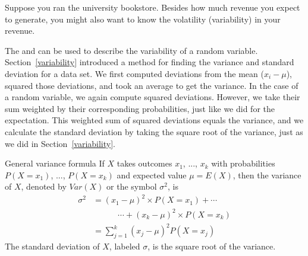 Suppose you ran the university bookstore. Besides how much revenue you expect to generate, you might also want to know the volatility (variability) in your revenue. 

The  and  can be used to describe the variability of a random variable. Section~\ref{variability}
introduced a method for finding the variance and standard deviation for a data set. We first computed deviations from the mean ($x_i - \mu$), squared those deviations, and took an average to get the variance. In the case of a random variable, we again compute squared deviations. However, we take their sum weighted by their corresponding probabilities, just like we did for the expectation. This weighted sum of squared deviations equals the variance, and we calculate the standard deviation by taking the square root of the variance, just as we did in Section~\ref{variability}.

\begin{onebox}{General variance formula}
If $X$ takes outcomes $x_1$, ..., $x_k$ with probabilities $P(X=x_1)$, ..., $P(X=x_k)$ and expected value $\mu=E(X)$, then the variance of $X$, denoted by $Var(X)$ or the symbol $\sigma^2$, is
\begin{align*}
\sigma^2 &= (x_1-\mu)^2\times P(X=x_1) + \cdots \\
	& \qquad\quad\cdots+ (x_k-\mu)^2\times P(X=x_k) \\
	&= \sum_{j=1}^{k} (x_j - \mu)^2 P(X=x_j)
\end{align*}
The standard deviation of $X$, labeled
$\sigma$,
is the square root of the variance.
\end{onebox}


